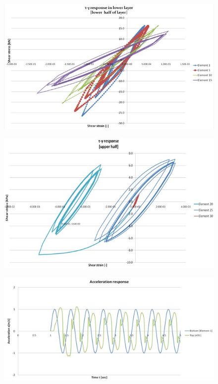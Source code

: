 \documentclass[10pt,a4paper]{report}
\begin{document}
\begin{figure}[h!]
		\centering
		\includegraphics[width=0.7\linewidth]{"response1"}
		\caption[Hysteresis loops on the lower half of the soil layer]{}
		\caption{}
		\label{response1}
	\end{figure}
	
	\begin{figure}[h!]
		\centering
		\includegraphics[width=0.7\linewidth]{"response2"}
		\caption[Hysteresis loops for lower half of the soil layer]{}
		\caption{}
		\label{response2}
	\end{figure}
	
	\begin{figure}[h]
		\centering
		\includegraphics[width=0.7\linewidth]{"acc_response1"}
		\caption[Acceleration response (surface and bottom)]{}
		\caption{}
		\label{acc1}
	\end{figure}
	
\end{document}
